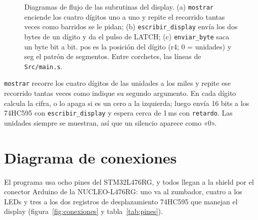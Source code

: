 \documentclass[11pt,letterpaper]{article}
\begin{document}
\begin{figure}[H]
  \caption{Diagramas de flujo de las subrutinas del display. (a) \texttt{mostrar} enciende los cuatro dígitos
    uno a uno y repite el recorrido tantas veces como barridos se le pidan; (b) \texttt{escribir\_display}
    envía los dos bytes de un dígito y da el pulso de LATCH; (c) \texttt{enviar\_byte} saca un byte bit a bit.
    pos es la posición del dígito (r4; 0 = unidades) y seg el patrón de segmentos. Entre corchetes, las
    líneas de \texttt{Src/main.s}.}
  \label{fig:display}
\end{figure}

\texttt{mostrar} recorre los cuatro dígitos de las unidades a los miles y repite ese recorrido tantas veces
como indique su segundo argumento. En cada dígito calcula la cifra, o lo apaga si es un cero a la
izquierda; luego envía 16 bits a los 74HC595 con \texttt{escribir\_display} y espera cerca de 1\,ms con
\texttt{retardo}. Las unidades siempre se muestran, así que un silencio aparece como «0».

\section{Diagrama de conexiones}

El programa usa ocho pines del STM32L476RG, y todos llegan a la shield por el conector Arduino de la
NUCLEO-L476RG: uno va al zumbador, cuatro a los LEDs y tres a los dos registros de desplazamiento 74HC595
que manejan el display (figura~\ref{fig:conexiones} y tabla~\ref{tab:pines}).
\end{document}
